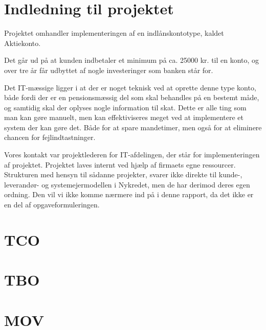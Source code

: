 \documentclass[12pt,a4paper,oneside]{article}
\begin{document}
\section{Indledning til projektet}
Projektet omhandler implementeringen af en indlånskontotype, kaldet Aktiekonto.

Det går ud på at kunden indbetaler et minimum på ca. 25000 kr. til en konto, og
over tre år får udbyttet af nogle investeringer som banken står for.

Det IT-mæssige ligger i at der er noget teknisk ved at oprette denne type konto,
både fordi der er en pensionsmæssig del som skal behandles på en bestemt måde, og
samtidig skal der oplyses nogle information til skat. Dette er alle ting som man
kan gøre manuelt, men kan effektiviseres meget ved at implementere et system der
kan gøre det. Både for at spare mandetimer, men også for at eliminere chancen
for fejlindtastninger.

Vores kontakt var projektlederen for IT-afdelingen, der står for
implementeringen af projektet. Projektet laves internt ved hjælp af firmaets
egne ressourcer. Strukturen med hensyn til sådanne projekter, svarer
ikke direkte til kunde-, leverandør- og systemejermodellen i Nykredet, men de
har derimod deres egen ordning. Den vil vi ikke komme nærmere ind på i denne
rapport, da det ikke er en del af opgaveformuleringen.

\section{TCO}


\section{TBO}


\section{MOV}

\end{document}
